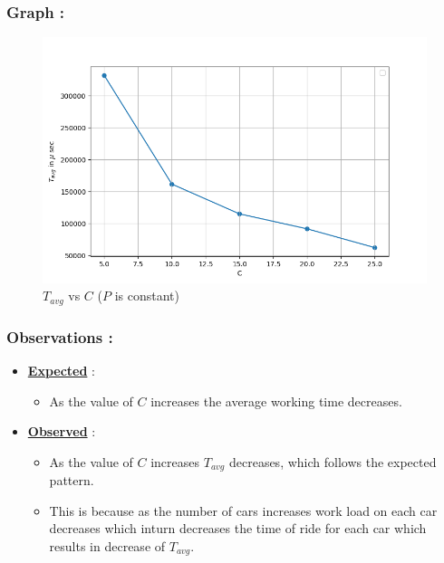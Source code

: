 \documentclass[12pt,a4paper]{article}
\begin{document}
	\subsubsection{Graph :}
	    \begin{figure}[H]
		\centering
		\includegraphics[width=1\textwidth]{P_const}
		\caption{$T_{avg}$ vs $C$ ($P$ is constant)}
	    \end{figure}

	\subsubsection{Observations :} 
	\begin{itemize}
		\item \underline{\textbf{Expected}} : 
		\begin{itemize}
			\item As the value of $C$ increases the average working time decreases.
		\end{itemize}
		\item \underline{\textbf{Observed}} : 
		\begin{itemize}
			\item As the value of $C$ increases $T_{avg}$ decreases, which follows the expected pattern.
			\item This is because as the number of cars increases work load on each car decreases which inturn decreases the time of ride for each car which results in decrease of $T_{avg}$. 
		\end{itemize}
	\end{itemize}  		
	
\end{document}
